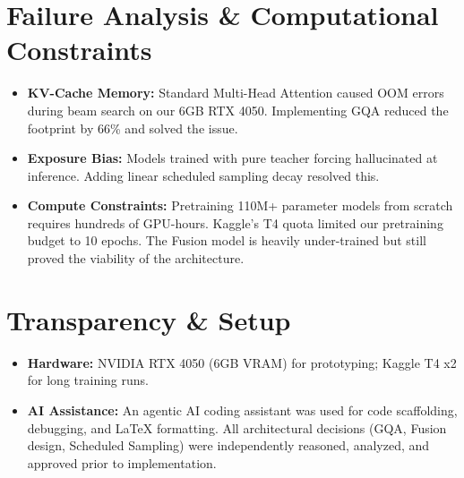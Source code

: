 \documentclass[11pt, a4paper]{article}
\begin{document}
\section{Failure Analysis \& Computational Constraints}
\begin{itemize}
    \item \textbf{KV-Cache Memory:} Standard Multi-Head Attention caused OOM errors during beam search on our 6GB RTX 4050. Implementing GQA reduced the footprint by 66\% and solved the issue.
    \item \textbf{Exposure Bias:} Models trained with pure teacher forcing hallucinated at inference. Adding linear scheduled sampling decay resolved this.
    \item \textbf{Compute Constraints:} Pretraining 110M+ parameter models from scratch requires hundreds of GPU-hours. Kaggle's T4 quota limited our pretraining budget to 10 epochs. The Fusion model is heavily under-trained but still proved the viability of the architecture.
\end{itemize}

\section{Transparency \& Setup}
\begin{itemize}
    \item \textbf{Hardware:} NVIDIA RTX 4050 (6GB VRAM) for prototyping; Kaggle T4 x2 for long training runs.
    \item \textbf{AI Assistance:} An agentic AI coding assistant was used for code scaffolding, debugging, and LaTeX formatting. All architectural decisions (GQA, Fusion design, Scheduled Sampling) were independently reasoned, analyzed, and approved prior to implementation.
\end{itemize}
\end{document}
